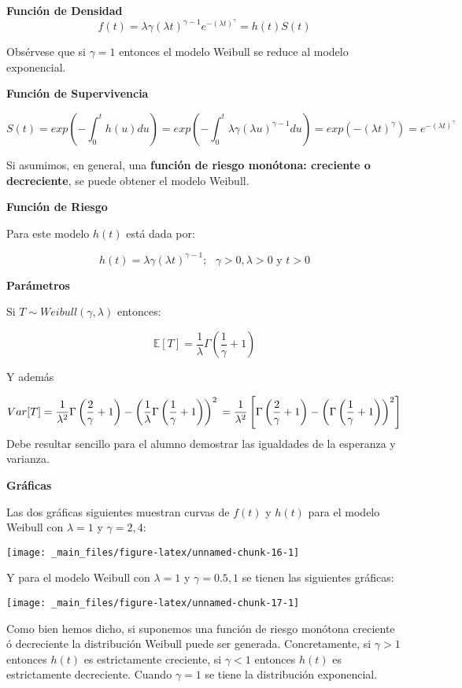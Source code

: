 \documentclass[
  a4paper,
  oneside,
  openany]{book}
\begin{document}
\textbf{Función de Densidad}
\[
f(t)=\lambda \gamma(\lambda t)^{\gamma-1}e^{-(\lambda t)^\gamma}=h(t)S(t)
\]

Obsérvese que si \(\gamma =1\) entonces el modelo Weibull se reduce al modelo exponencial.

\textbf{Función de Supervivencia}

\[
S(t)=exp\left(-\int_0^{t}h(u)du\right)=exp\left(-\int_0^{t}\lambda \gamma(\lambda u)^{\gamma-1} du\right)=exp(-(\lambda t)^\gamma)=e^{-(\lambda t)^\gamma}
\]

Si asumimos, en general, una \textbf{función de riesgo monótona: creciente o decreciente}, se puede obtener el modelo Weibull.

\textbf{Función de Riesgo}

Para este modelo \(h(t)\) está dada por:

\[
h(t)=\lambda \gamma(\lambda t)^{\gamma-1}; \ \ \ \gamma>0, \lambda>0 \mbox{ y } t>0
\]

\textbf{Parámetros}

Si \(T\sim Weibull(\gamma,\lambda)\) entonces:

\[
\mathbb{E}[T]=\frac{1}{\lambda}\Gamma\left(\frac{1}{\gamma}+1\right)
\]

Y además

\[
Var[T]=\frac{1}{\lambda^2}\Gamma\left(\frac{2}{\gamma}+1\right)-\left(\frac{1}{\lambda}\Gamma\left(\frac{1}{\gamma}+1\right)\right)^2
\\=\frac{1}{\lambda^2}\left[\Gamma\left(\frac{2}{\gamma}+1\right)-\left(\Gamma\left(\frac{1}{\gamma}+1\right)\right)^2\right]
\]
Debe resultar sencillo para el alumno demostrar las igualdades de la esperanza y varianza.

\textbf{Gráficas}

Las dos gráficas siguientes muestran curvas de \(f(t)\) y \(h(t)\) para el modelo Weibull con \(\lambda=1\) y \(\gamma=2,4\):

\begin{center}\texttt{[image: \_main\_files/figure-latex/unnamed-chunk-16-1]} \end{center}

Y para el modelo Weibull con \(\lambda=1\) y \(\gamma=0.5,1\) se tienen las siguientes gráficas:

\begin{center}\texttt{[image: \_main\_files/figure-latex/unnamed-chunk-17-1]} \end{center}

Como bien hemos dicho, si suponemos una función de riesgo monótona creciente ó decreciente la distribución Weibull puede ser generada. Concretamente, si \(\gamma>1\) entonces \(h(t)\) es estrictamente creciente, si \(\gamma<1\) entonces \(h(t)\) es estrictamente decreciente. Cuando \(\gamma=1\) se tiene la distribución exponencial.
\end{document}
